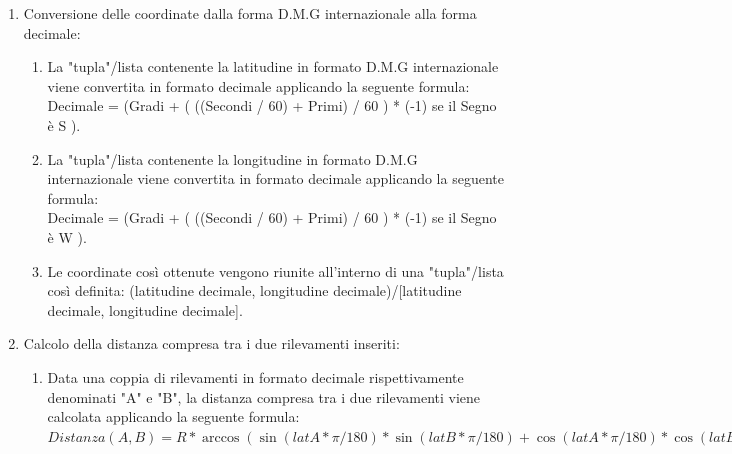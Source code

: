 \documentclass{article}
\begin{document}
\begin{enumerate}
	\item Conversione delle coordinate dalla forma D.M.G internazionale alla forma decimale:
	\begin{enumerate}
		\item La "tupla"/lista contenente la latitudine in formato D.M.G internazionale viene convertita in formato decimale applicando la seguente formula: \\Decimale = (Gradi + ( ((Secondi / 60) + Primi) / 60 ) * (-1) se il Segno è  S ). 
		\item La "tupla"/lista contenente la longitudine in formato D.M.G internazionale viene convertita in formato decimale applicando la seguente formula: \\Decimale = (Gradi + ( ((Secondi / 60) + Primi) / 60 ) * (-1) se il Segno è  W ).
		\item Le coordinate così ottenute vengono riunite all'interno di una "tupla"/lista così definita: (latitudine decimale, longitudine decimale)/[latitudine decimale, longitudine decimale].
	\end{enumerate}

	\item Calcolo della distanza compresa tra i due rilevamenti inseriti: 
	\begin{enumerate}
		\item Data una coppia di rilevamenti in formato decimale rispettivamente denominati "A" e "B", la distanza compresa tra i due rilevamenti viene calcolata applicando la seguente formula: \\$Distanza(A, B) = R * \arccos(\sin(latA * \pi / 180) * \sin(latB * \pi / 180) + \cos(latA * \pi / 180) * \cos(latB * \pi / 180) * \cos((lonA - lonB) * \pi / 180)). $
	\end{enumerate}


\end{enumerate}
\end{document}
